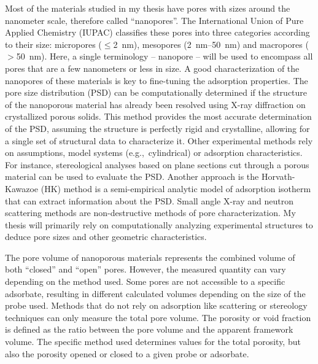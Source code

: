 \documentclass[main.tex]{subfiles}
\begin{document}

Most of the materials studied in my thesis have pores with sizes around the nanometer scale, therefore called ``nanopores''. The International Union of Pure Applied Chemistry (IUPAC) classifies these pores into three categories according to their size: micropores ($\leq$\SI{2}{\nano\meter}), mesopores (\SI{2}{\nano\meter}--\SI{50}{\nano\meter}) and macropores ($>$\SI{50}{\nano\meter}).\autocite{Sing_1985} Here, a single terminology -- nanopore -- will be used to encompass all pores that are a few nanometers or less in size. A good characterization of the nanopores of these materials is key to fine-tuning the adsorption properties.\autocite{Yan_2020} The pore size distribution (PSD) can be computationally determined if the structure of the nanoporous material has already been resolved using X-ray diffraction on crystallized porous solids. This method provides the most accurate determination of the PSD, assuming the structure is perfectly rigid and crystalline, allowing for a single set of structural data to characterize it. Other experimental methods rely on assumptions, model systems (e.g.,\ cylindrical) or adsorption characteristics. For instance, stereological analyses based on plane sections cut through a porous material can be used to evaluate the PSD.\autocite{Haynes_1973} Another
approach is the Horvath-Kawazoe (HK) method is a semi-empirical analytic model of adsorption isotherm that can extract information about the PSD. Small angle X-ray and neutron scattering methods are non-destructive methods of pore characterization.\autocite{Radlinski_2004} My thesis will primarily rely on computationally analyzing experimental structures to deduce pore sizes and other geometric characteristics. 

The pore volume of nanoporous materials represents the combined volume of both ``closed''
and ``open'' pores. However, the measured quantity can vary depending on the method used.
Some pores are not accessible to a specific adsorbate, resulting in different calculated
volumes depending on the size of the probe used. Methods that do not rely on adsorption like scattering or stereology techniques can only measure the total pore volume. The porosity or void fraction is defined as the ratio between the pore volume and the apparent framework volume. The specific method used determines values for the total porosity, but also the porosity opened or closed to a given probe or adsorbate.
\end{document}
